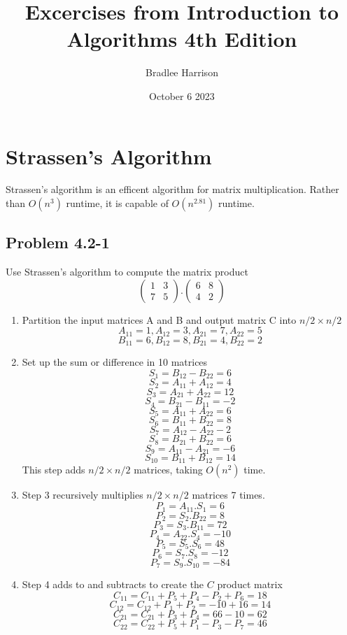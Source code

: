 \documentclass[12pt]{article}
\begin{document}
	
	\title{Excercises from Introduction to Algorithms 4th Edition}
	\author{Bradlee Harrison}
	\date{October 6 2023}
	\maketitle
	\section{Strassen's Algorithm}
	Strassen's algorithm is an efficent algorithm for matrix multiplication. Rather than $O(n^3)$ runtime, it is capable of $O(n^2.81)$ runtime.
	
	\subsection*{Problem 4.2-1}
	Use Strassen's algorithm to compute the matrix product
	$$
	\begin{pmatrix}
		1 & 3 \\ 7 & 5 
	\end{pmatrix} .
	\begin{pmatrix}
		6 & 8 \\ 4 & 2
	\end{pmatrix}$$
	\begin{enumerate}
		\item Partition the input matrices A and B and output matrix C into $n/2 \times n/2$ 
		$$ A_{11} = 1, A_{12} = 3, A_{21} = 7, A_{22} = 5 $$
		$$ B_{11} = 6, B_{12} = 8, B_{21} = 4, B_{22} = 2 $$
		\item Set up the sum or difference in 10 matrices
		$$ S_1 = B_{12} - B_{22} = 6 $$
		$$ S_2 = A_{11} + A_{12} = 4 $$
		$$ S_3 = A_{21} + A_{22} = 12 $$
		$$ S_4 = B_{21} - B_{11} = -2 $$ 
		$$ S_5 = A_{11} + A_{22} = 6 $$
		$$ S_6 = B_{11} + B_{22} = 8 $$
		$$ S_7 = A_{12} - A_{22}  -2 $$
		$$ S_8 = B_{21} + B_{22} = 6 $$
		$$ S_9 = A_{11} - A_{21} = -6 $$
		$$ S_10 = B_{11} + B_{12} = 14 $$ 
		This step adds $n/2 \times n/2$ matrices, taking $O(n^2)$ time.
		\item Step 3 recursively multiplies $n/2 \times n/2$ matrices 7 times.
		$$ P_1 = A_{11}.S_1 = 6 $$
		$$ P_2 = S_2. B_{22} = 8 $$
		$$ P_3 = S_3 . B_{11} = 72 $$
		$$ P_4 = A_{22}.S_4 = -10 $$
		$$ P_5 = S_5.S_6 = 48 $$
		$$ P_6 = S_7.S_8 = -12 $$
		$$ P_7 = S_9.S_10 = - 84$$
		\item Step 4 adds to and subtracts to create the $C$ product matrix
		$$ C_{11} = C_{11} + P_5 + P_4 - P_2 + P_6 = 18$$
		$$ C_{12} = C_{12} + P_1 + P_2 = -10 + 16 = 14 $$
		$$ C_{21} = C_{21} + P_3 + P_4 = 66 - 10 = 62 $$
		$$ C_{22} = C_{22} + P_5 + P_1 - P_3 - P_7 = 46$$
	\end{enumerate}
\end{document}
